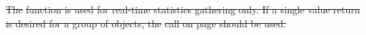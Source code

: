 \documentclass[12pt]{report} %
\providecommand{\DIFdeltex}[1]{{\protect\color{red}\sout{#1}}}                      %
\providecommand{\DIFdel}[1]{\texorpdfstring{\DIFdeltex{#1}}{}} %
\begin{document}
\DIFdel{The }%
\DIFdel{function is used for real-time statistics gathering only.
If a single value return is desired for a group of objects, the }%
\DIFdel{call on page \pageref{func:StatGetReduce} should be used. 
}%

\end{document}
